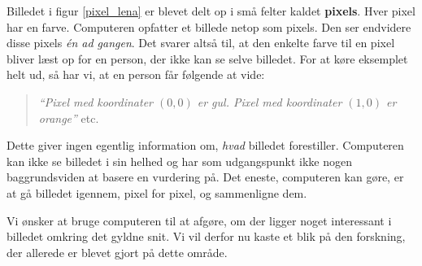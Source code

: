 {Billedet i figur \ref{pixel_lena} er blevet delt op i små felter kaldet
\textbf{pixels}. Hver pixel har en farve. Computeren opfatter et billede
netop som pixels. Den ser endvidere disse pixels \emph{én ad gangen}.
Det svarer altså til, at den enkelte farve til en pixel bliver læst op
for en person, der ikke kan se selve billedet. For at køre eksemplet
helt ud, så har vi, at en person får følgende at vide:
\begin{quote}
    \emph{``Pixel med koordinater $(0, 0)$ er gul. Pixel med
    koordinater $(1, 0)$ er orange''} etc.
\end{quote}
Dette giver ingen egentlig information om, \emph{hvad} billedet
forestiller. Computeren kan ikke se billedet i sin helhed og har som
udgangspunkt ikke nogen baggrundsviden at basere en vurdering på. Det
eneste, computeren kan gøre, er at gå billedet igennem, pixel for pixel,
og sammenligne dem.

Vi ønsker at bruge computeren til at afgøre, om der ligger noget
interessant i billedet omkring det gyldne snit. Vi vil derfor nu kaste
et blik på den forskning, der allerede er blevet gjort på dette område.

}

